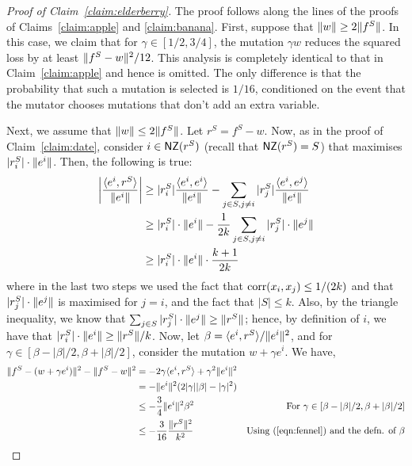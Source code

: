\begin{proof}[Proof of Claim~\ref{claim:elderberry}] 
The proof follows along the lines of the proofs of Claims~\ref{claim:apple} and
\ref{claim:banana}.  First, suppose that $\Vert w \Vert \geq 2 \Vert f^S \Vert$.
In this case, we claim that for $\gamma \in [1/2, 3/4]$, the mutation $\gamma w$
reduces the squared loss by at least $\Vert f^S - w \Vert^2/12$. This analysis is
completely identical to that in Claim~\ref{claim:apple} and hence is omitted.
The only difference is that the probability that such a mutation is selected is
$1/16$, conditioned on the event that the mutator chooses mutations that don't
add an extra variable.

Next, we assume that $\Vert w \Vert \leq 2 \Vert f^S \Vert$. Let $r^S = f^S - w$.
Now, as in the proof of Claim~\ref{claim:date}, consider $i \in \mathsf{NZ}(r^S)$ (recall
that $\mathsf{NZ}(r^S) = S$) that maximises $|r^S_i| \cdot \Vert e^i \Vert$.
Then, the following is true:
\begin{align}
\left| \frac{\langle e^i, r^S \rangle}{\Vert e^i \Vert} \right| &\geq |r^S_i|
\frac{\langle e^i, e^i \rangle}{\Vert e^i \Vert} - \sum_{j \in S, j \neq i} |r^S_j|
\frac{\langle e^i, e^j \rangle}{\Vert e^i \Vert} \nonumber \\
&\geq |r^S_i| \cdot \Vert e^i \Vert - \frac{1}{2k} \sum_{j \in S, j \neq i}
|r^S_j| \cdot \Vert e^j \Vert \nonumber \\
&\geq |r^S_i| \cdot \Vert e^i \Vert \cdot \frac{k+1}{2k} \label{eqn:fennel}
\end{align}
%
where in the last two steps we used the fact that $\mathrm{corr}(x_i, x_j) \leq 1/(2k)$
and that $|r^S_j| \cdot \Vert e^j \Vert$ is maximised for $j = i$, and the fact
that $|S| \leq k$. Also, by the triangle inequality, we know that $\sum_{j \in
S} |r^S_j| \cdot \Vert e^j \Vert \geq \Vert r^S \Vert$; hence, by definition of
$i$, we have that $|r^S_i| \cdot \Vert e^i \Vert \geq \Vert r^S \Vert/k$. Now, let
$\beta = \langle e^i, r^S \rangle/\Vert e^i \Vert^2$, and for $\gamma \in [\beta -
|\beta|/2, \beta + |\beta|/2]$, consider the mutation $w + \gamma e^i$. We have,
\begin{align*}
\Vert f^S - (w + \gamma e^i) \Vert^2 - \Vert f^S - w \Vert^2 &= -2 \gamma
\langle e^i, r^S \rangle + \gamma^2 \Vert e^i \Vert^2 \\
&= - \Vert e^i \Vert^2(2 |\gamma| |\beta| - |\gamma|^2) \\
&\leq - \frac{3}{4} \Vert e^i \Vert^2 \beta^2 &\mbox{For $\gamma \in [\beta -
|\beta|/2, \beta + |\beta|/2]$} \\
&\leq - \frac{3}{16} \frac{\Vert r^S \Vert^2}{k^2} &\mbox{Using
(\ref{eqn:fennel}) and the defn. of $\beta$}
\end{align*}


\end{proof}
